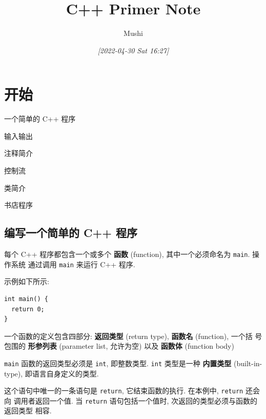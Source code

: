 \documentclass[lang=cn]{elegantbook}
\author{Mushi}
\date{\textit{[2022-04-30 Sat 16:27]}}
\title{C++ Primer Note}
\begin{document}
\maketitle
\tableofcontents



\mainmatter

\chapter{开始}
\label{sec:org748ad1f}

\begin{introduction}
  \item 一个简单的 C++ 程序
  \item 输入输出
  \item 注释简介
  \item 控制流
  \item 类简介
  \item 书店程序
\end{introduction}

\section{编写一个简单的 C++ 程序}
\label{sec:org615edee}

每个 C++ 程序都包含一个或多个 \textbf{函数} (function), 其中一个必须命名为 \texttt{main}. 操作系统
通过调用 \texttt{main} 来运行 C++ 程序.

\vspace*{1\baselineskip}

示例如下所示:

\begin{verbatim}
int main() {
  return 0;
}
\end{verbatim}

一个函数的定义包含四部分: \textbf{返回类型} (return type), \textbf{函数名} (function), 一个括
号包围的 \textbf{形参列表} (parameter list, 允许为空) 以及 \textbf{函数体} (function body)

\texttt{main} 函数的返回类型必须是 \texttt{int}, 即整数类型. \texttt{int} 类型是一种 \textbf{内置类型}
(built-in-type), 即语言自身定义的类型.

这个语句中唯一的一条语句是 \texttt{return}, 它结束函数的执行. 在本例中, \texttt{return} 还会向
调用者返回一个值. 当 \texttt{return} 语句包括一个值时, 次返回的类型必须与函数的返回类型
相容.

\vspace*{1\baselineskip}
\end{document}
